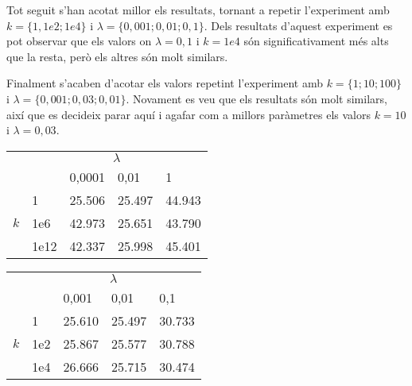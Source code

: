 \documentclass[a4paper, 12pt]{article}
\begin{document}
Tot seguit s'han acotat millor els resultats, tornant a repetir l'experiment amb $k=\{1,1e2; 1e4\}$ i 
$\lambda=\{ 0,001; 0,01; 0,1 \} $. Dels resultats d'aquest experiment es pot observar que els valors on
$\lambda = 0,1$ i $k = 1e4$ són significativament més alts que la resta, però els altres són molt similars.

Finalment s'acaben d'acotar els valors repetint l'experiment amb $k=\{1; 10; 100\}$ i $\lambda=\{0,001; 0,03; 0,01\}$.
Novament es veu que els resultats són molt similars, així que es decideix parar aquí i agafar com a millors
paràmetres els valors $k=10$ i $\lambda = 0,03$.


\begin{minipage}{\linewidth}
	\begin{minipage}[b]{0.33\linewidth}
		\scriptsize
		\centering
		\begin{tabular}{l | l | l | l | l|}
			\multicolumn{1}{c}{} & \multicolumn{4}{c}{$\lambda$} \\
			\cline{3-5}
			\multicolumn{2}{c|}{} & 0,0001 & 0,01 & 1 \\
			\cline{2-5}
			\multirow{3}{*}{$k$}
			& 1 & \cellcolor{Green} 25.506 & \cellcolor{Green} 25.497 &\cellcolor{Red!60} 44.943 \\
			& 1e6 & \cellcolor{Goldenrod!70}42.973 & \cellcolor{Green} 25.651 & \cellcolor{Red!30}43.790\\
			& 1e12 & \cellcolor{Goldenrod!60}42.337 & \cellcolor{Green}25.998 & \cellcolor{Red}45.401 \\
			\cline{2-5}
		\end{tabular}
	\end{minipage}
	\hfill
	\begin{minipage}[b]{0.32\linewidth}
		\scriptsize
		\centering
		\begin{tabular}{l | l | l | l | l|}
			\multicolumn{1}{c}{} & \multicolumn{4}{c}{$\lambda$} \\
			\cline{3-5}
			\multicolumn{2}{c|}{} & 0,001 & 0,01 & 0,1 \\
			\cline{2-5}
			\multirow{3}{*}{$k$}
			& 1 & \cellcolor{Green!50} 25.610 & \cellcolor{Green} 25.497 & \cellcolor{Red!60}30.733 \\
			& 1e2 & \cellcolor{Goldenrod!70}25.867 & \cellcolor{Green!60}25.577 & \cellcolor{Red!60}30.788 \\
			& 1e4 & \cellcolor{Goldenrod}26.666 & \cellcolor{Green!40}25.715 & \cellcolor{Red!60}30.474 \\
			\cline{2-5}
		\end{tabular}

\end{minipage}
\end{minipage}
\end{document}
